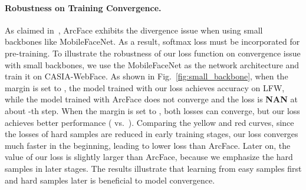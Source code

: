 \documentclass[10pt,twocolumn,letterpaper]{article}
\begin{document}
\vspace{-3mm}
\paragraph{Robustness on Training Convergence.}
As claimed in~\cite{li2019airface}, ArcFace exhibits the divergence issue when using small backbones like MobileFaceNet.
As a result, softmax loss must be incorporated for pre-training. To illustrate the robustness of our loss function on convergence issue with small backbones, we use the MobileFaceNet as the network architecture and train it on CASIA-WebFace.
As shown in Fig.~\ref{fig:small_backbone}, when the margin  is set to , the model trained with our loss achieves  accuracy on LFW, while the model trained with ArcFace does not converge and the loss is \textbf{NAN} at about -th step.
When the margin  is set to , both losses can converge, but our loss achieves better performance ( vs.~).
Comparing the yellow and red curves, since the losses of hard samples are reduced in early training stages, our loss converges much faster in the beginning, leading to lower loss than ArcFace. Later on, the value of our loss is slightly larger than ArcFace, because we emphasize the hard samples in later stages.
The results illustrate that learning from easy samples first and hard samples later is beneficial to model convergence.

\begin{table}[t!]
\begin{center}
\scriptsize
\caption{\small \textbf{Verification comparison with SOTA methods} on LFW, two pose benchmarks: CFP-FP and CPLFW, and two age benchmarks: AgeDB and CALFW.  denotes our re-implemented results with the backbone ResNet100~\cite{deng2018arcface}.}
\label{tab:comp_pose}
\end{center}
\end{table}
\end{document}
